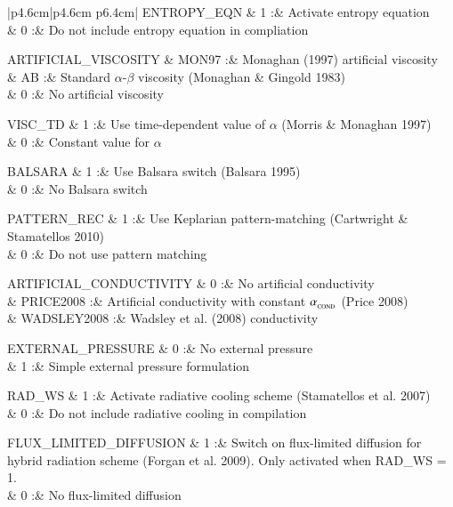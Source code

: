 \documentclass[a4paper]{article}
\begin{document}
\begin{center}
\begin{supertabular}{|p{4.6cm}|p{4.6cm} p{6.4cm}|}
 ENTROPY\_EQN  & 1 :& Activate entropy equation \\
               & 0 :& Do not include entropy equation in compliation \\ \hline

 ARTIFICIAL\_VISCOSITY  & MON97 :& Monaghan (1997) artificial viscosity \\
               & AB    :& Standard $\alpha$-$\beta$ viscosity (Monaghan \& Gingold 1983)\\
               & 0     :& No artificial viscosity \\ \hline

 VISC\_TD      & 1  :& Use time-dependent value of $\alpha$ (Morris \& Monaghan 1997)\\
               & 0  :& Constant value for $\alpha$ \\ \hline

 BALSARA       & 1  :& Use Balsara switch (Balsara 1995) \\
               & 0  :& No Balsara switch \\ \hline

 PATTERN\_REC  & 1 :& Use Keplarian pattern-matching (Cartwright \& Stamatellos 2010) \\
               & 0 :& Do not use pattern matching \\ \hline

 ARTIFICIAL\_CONDUCTIVITY  & 0         :& No artificial conductivity \\
                           & PRICE2008 :& Artificial conductivity with constant $\alpha_{_{\rm COND}}$ (Price 2008)\\ 
                           & WADSLEY2008 :& Wadsley et al. (2008) conductivity\\ \hline

 EXTERNAL\_PRESSURE & 0 :& No external pressure \\
                    & 1 :& Simple external pressure formulation \\ \hline

 RAD\_WS       & 1 :& Activate radiative cooling scheme (Stamatellos et al. 2007) \\
               & 0 :& Do not include radiative cooling in compilation \\ \hline

 FLUX\_LIMITED\_DIFFUSION & 1 :& Switch on flux-limited diffusion for hybrid radiation scheme (Forgan et al. 2009).  Only activated when RAD\_WS = 1. \\
                          & 0 :& No flux-limited diffusion \\ \hline


\end{supertabular}
\end{center}
\end{document}
